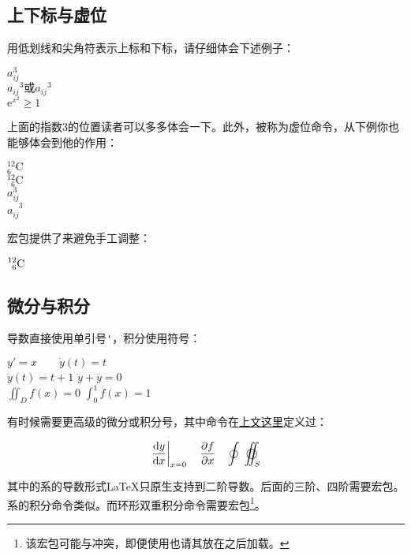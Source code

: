 \subsection{上下标与虚位}
用低划线和尖角符表示上标和下标，请仔细体会下述例子：

\begin{codeshow}
$a^3_{ij}$ \\
${a_{ij}}^3\text{或}a_{ij}{}^3$\\
$\mathrm{e}^{x^2}\geq 1$
\end{codeshow}

上面的指数3的位置读者可以多多体会一下。此外，被称为虚位命令，从下例你也能够体会到他的作用：

\begin{codeshow}
${}^{12}_{6}\mathrm{C}$ \\
${}^{12}_{\phantom{1}6}
\mathrm{C}$ \\
$a^3_{ij}$ \\
$a^{\phantom{ij}3}_{ij}$
\end{codeshow}

宏包提供了来避免手工调整：
\begin{codeshow}
$\prescript{12}{6}{\mathrm{C}}$
\end{codeshow}

\subsection{微分与积分}
导数直接使用单引号\verb|'|，积分使用符号：

\begin{codeshow}
$y'=x \qquad \dot{y}(t)=t$ \\
$\ddot{y}(t)=t+1$
$\dddot{y}+\ddddot{y}=0$ \\
$\iint_{D}f(x)=0$
$\int_{0}^{1}f(x)=1$
\end{codeshow}

有时候需要更高级的微分或积分号，其中命令在\hyperref[cmd:ud]{上文这里}定义过：
\begin{codeshow}
\[\left.\frac{\ud y}{\ud x}\right|_{x=0}\quad
\frac{\partial f}{\partial x}
\quad\oint\;\varoiint_S \]
\end{codeshow}

其中的系的导数形式\LaTeX 只原生支持到二阶导数。后面的三阶、四阶需要宏包。系的积分命令类似。而环形双重积分命令需要宏包\footnote{该宏包可能与冲突，即便使用也请其放在之后加载。}。

